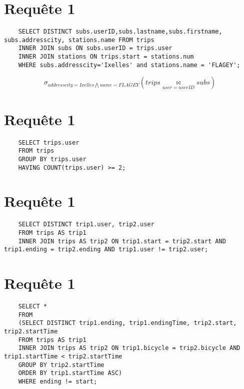 \documentclass[a4paper,11pt]{article}
\DeclareMathOperator*{\join}{\bowtie}
\begin{document}
\section{Requ\^ete 1}
    \begin{lstlisting}
    SELECT DISTINCT subs.userID,subs.lastname,subs.firstname, subs.addresscity, stations.name FROM trips 
    INNER JOIN subs ON subs.userID = trips.user
    INNER JOIN stations ON trips.start = stations.num
    WHERE subs.addresscity='Ixelles' and stations.name = 'FLAGEY';
    \end{lstlisting}

    \begin{displaymath}
    \sigma_{addresscity=Ixelles \bigwedge name=FLAGEY}(trips \join\limits_{user=userID}^{} subs)
    \end{displaymath}

\section{Requ\^ete 1}
    \begin{lstlisting}
    SELECT trips.user
    FROM trips
    GROUP BY trips.user
    HAVING COUNT(trips.user) >= 2;
    \end{lstlisting}


\section{Requ\^ete 1}
    \begin{lstlisting}
    SELECT DISTINCT trip1.user, trip2.user
    FROM trips AS trip1
    INNER JOIN trips AS trip2 ON trip1.start = trip2.start AND trip1.ending = trip2.ending AND trip1.user != trip2.user;
    \end{lstlisting}


\section{Requ\^ete 1}
    \begin{lstlisting}
    SELECT *
    FROM
    (SELECT DISTINCT trip1.ending, trip1.endingTime, trip2.start, trip2.startTime
    FROM trips AS trip1
    INNER JOIN trips AS trip2 ON trip1.bicycle = trip2.bicycle AND trip1.startTime < trip2.startTime
    GROUP BY trip2.startTime
    ORDER BY trip1.startTime ASC)
    WHERE ending != start;
    \end{lstlisting}
\end{document}
